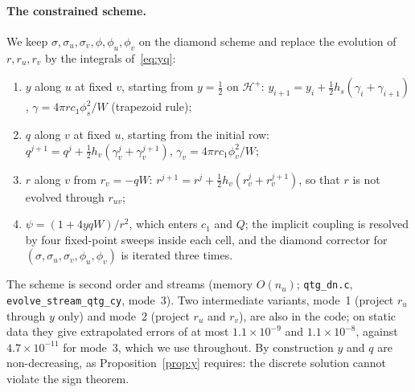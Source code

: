 \documentclass[11pt]{article}
\begin{document}
\paragraph{The constrained scheme.} We keep $\sigma,\sigma_u,\sigma_v,\phi,\phi_u,\phi_v$ on the diamond scheme and replace the evolution of $r,r_u,r_v$ by the integrals of~\eqref{eq:yq}:
\begin{enumerate}
\item $y$ along $u$ at fixed $v$, starting from $y=\tfrac12$ on $\mathcal H^{+}$: $y_{i+1}=y_i+\tfrac12h_s(\gamma_i+\gamma_{i+1})$, $\gamma=4\pi rc_1\phi_s^{2}/W$ (trapezoid rule);
\item $q$ along $v$ at fixed $u$, starting from the initial row: $q^{j+1}=q^{j}+\tfrac12h_v(\gamma_v^{j}+\gamma_v^{j+1})$, $\gamma_v=4\pi rc_1\phi_v^{2}/W$;
\item $r$ along $v$ from $r_v=-qW$: $r^{j+1}=r^{j}+\tfrac12h_v(r_v^{j}+r_v^{j+1})$, so that $r$ is not evolved through $r_{uv}$;
\item $\psi=(1+4yqW)/r^{2}$, which enters $c_1$ and $Q$; the implicit coupling is resolved by four fixed-point sweeps inside each cell, and the diamond corrector for $(\sigma,\sigma_u,\sigma_v,\phi_u,\phi_v)$ is iterated three times.
\end{enumerate}
The scheme is second order and streams (memory $O(n_u)$; \texttt{qtg\_dn.c}, \texttt{evolve\_stream\_qtg\_cy}, mode~3). Two intermediate variants, mode~1 (project $r_u$ through $y$ only) and mode~2 (project $r_u$ and $r_v$), are also in the code; on static data they give extrapolated errors of at most $1.1\times10^{-9}$ and $1.1\times10^{-8}$, against $4.7\times10^{-11}$ for mode~3, which we use throughout. By construction $y$ and $q$ are non-decreasing, as Proposition~\ref{prop:y} requires: the discrete solution cannot violate the sign theorem.
\end{document}
